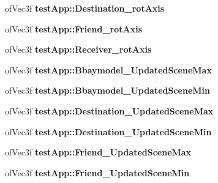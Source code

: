\begin{DoxyCompactItemize}
\item 
\hypertarget{group___int_variables_ga3437f00aaf4f314231083a497769e20f}{of\-Vec3f {\bfseries test\-App\-::\-Destination\-\_\-rot\-Axis}}\label{group___int_variables_ga3437f00aaf4f314231083a497769e20f}

\item 
\hypertarget{group___int_variables_ga58a34e2c2663f41bfbbe0afecd5e7840}{of\-Vec3f {\bfseries test\-App\-::\-Friend\-\_\-rot\-Axis}}\label{group___int_variables_ga58a34e2c2663f41bfbbe0afecd5e7840}

\item 
\hypertarget{group___int_variables_gaeba07064ae259ba1985489f050017329}{of\-Vec3f {\bfseries test\-App\-::\-Receiver\-\_\-rot\-Axis}}\label{group___int_variables_gaeba07064ae259ba1985489f050017329}

\item 
\hypertarget{group___int_variables_gae594a5e4ed236c84a7529cb920720f81}{of\-Vec3f {\bfseries test\-App\-::\-Bbaymodel\-\_\-\-Updated\-Scene\-Max}}\label{group___int_variables_gae594a5e4ed236c84a7529cb920720f81}

\item 
\hypertarget{group___int_variables_ga9083d055a14abafafe032b14bbe0b334}{of\-Vec3f {\bfseries test\-App\-::\-Bbaymodel\-\_\-\-Updated\-Scene\-Min}}\label{group___int_variables_ga9083d055a14abafafe032b14bbe0b334}

\item 
\hypertarget{group___int_variables_gaad3ef624b724f532ba05530f3cbe75b8}{of\-Vec3f {\bfseries test\-App\-::\-Destination\-\_\-\-Updated\-Scene\-Max}}\label{group___int_variables_gaad3ef624b724f532ba05530f3cbe75b8}

\item 
\hypertarget{group___int_variables_ga005ec4c57cfe292696ee305af0e05fb1}{of\-Vec3f {\bfseries test\-App\-::\-Destination\-\_\-\-Updated\-Scene\-Min}}\label{group___int_variables_ga005ec4c57cfe292696ee305af0e05fb1}

\item 
\hypertarget{group___int_variables_ga32083da4407729abb13fc5059ff0c025}{of\-Vec3f {\bfseries test\-App\-::\-Friend\-\_\-\-Updated\-Scene\-Max}}\label{group___int_variables_ga32083da4407729abb13fc5059ff0c025}

\item 
\hypertarget{group___int_variables_ga6d480baab26088aaee5f42c8e86d133b}{of\-Vec3f {\bfseries test\-App\-::\-Friend\-\_\-\-Updated\-Scene\-Min}}\label{group___int_variables_ga6d480baab26088aaee5f42c8e86d133b}


\end{DoxyCompactItemize}
